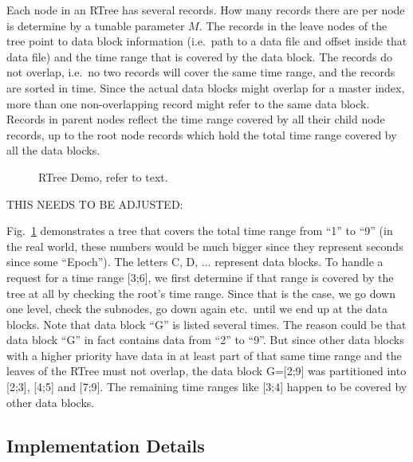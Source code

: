 Each node in an RTree has several records. How many records there are
per node is determine by a tunable parameter $M$.
The records in the leave nodes of the tree point to data block
information (i.e.\ path to a data file and offset inside that data
file) and the time range that is covered by the data block.
The records do not overlap, i.e.\ no two records will cover the same
time range, and the records are sorted in time.
Since the actual data blocks might overlap for a master index, more
than one non-overlapping record might refer to the same data block.
Records in parent nodes reflect the time range covered by all their
child node records, up to the root node records which hold the total
time range covered by all the data blocks.

\begin{figure}[htb]
\begin{center}
\end{center}
\caption{\label{fig:rtree}RTree Demo, refer to text.}
\end{figure}

THIS NEEDS TO BE ADJUSTED:

Fig.~\ref{fig:rtree} demonstrates a tree that covers the total
time range from ``1'' to ``9'' (in the real world, these numbers would
be much bigger since they represent seconds since some ``Epoch'').
The letters C, D, ... represent data blocks. To handle a request for a
time range [3;6], we first determine if that range is covered by the tree
at all by checking the root's time range. Since that is the case,
we go down one level, check the subnodes, go down again etc.\ until
we end up at the data blocks.
Note that data block ``G'' is listed several times. The reason could
be that data block ``G'' in fact contains data from ``2'' to ``9''.
But since other data blocks with a higher priority have data in at least part
of that same time range and the leaves of the RTree must not overlap,
the data block G=[2;9] was partitioned into [2;3], [4;5] and [7;9].
The remaining time ranges like [3;4] happen to be covered by other
data blocks.

\subsection{Implementation Details}

